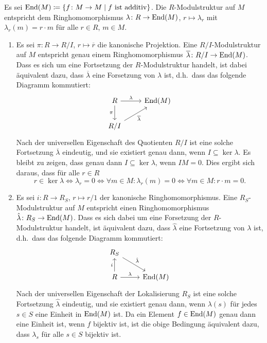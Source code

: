 \begin{solution}
  Es sei $\operatorname{End}(M) \coloneqq \{f \colon M \to M \mid \text{$f$ ist additiv}\}$.
  Die $R$-Modulstruktur auf $M$ entspricht dem Ringhomomorphismus $\lambda \colon R \to \operatorname{End}(M)$, $r \mapsto \lambda_r$ mit $\lambda_r(m) = r \cdot m$ für alle $r \in R$, $m \in M$.
  \begin{enumerate}
    \item
      Es sei $\pi \colon R \to R/I$, $r \mapsto \overline{r}$ die kanonische Projektion.
      Eine $R/I$-Modulstruktur auf $M$ entspricht genau einem Ringhomomorphismus $\overline{\lambda} \colon R/I \to \operatorname{End}(M)$.
      Dass es sich um eine Fortsetzung der $R$-Modulstruktur handelt, ist dabei äquivalent dazu, dass $\overline{\lambda}$ eine Forsetzung von $\lambda$ ist, d.h.\ dass das folgende Diagramm kommutiert:
      \[
        \begin{tikzcd}[ampersand replacement = \&]
              R
              \arrow{r}{\lambda}
              \arrow[swap]{d}{\pi}
          \&  \End(M)
          \\
              R/I
              \arrow[swap]{ru}{\overline{\lambda}}
          \&  {}
        \end{tikzcd}
      \]
      Nach der universellen Eigenschaft des Quotienten $R/I$ ist eine solche Fortsetzung $\overline{\lambda}$ eindeutig, und sie existiert genau dann, wenn $I \subseteq \ker \lambda$.
      Es bleibt zu zeigen, dass genau dann $I \subseteq \ker \lambda$, wenn $IM = 0$.
      Dies ergibt sich daraus, dass für alle $r \in R$
      \[
              r \in \ker \lambda
        \iff  \lambda_r = 0
        \iff  \forall m \in M : \lambda_r(m) = 0
        \iff  \forall m \in M : r \cdot m = 0.
      \]
    \item
      Es sei $i \colon R \to R_S$, $r \mapsto r/1$ der kanonische Ringhomomorphismus.
      Eine $R_S$-Mo\-dul\-struk\-tur auf $M$ entspricht einen Ringhomomorphismus $\hat{\lambda} \colon R_S \to \operatorname{End}(M)$.
      Dass es sich dabei um eine Forsetzung der $R$-Modulstruktur handelt, ist äquivalent dazu, dass $\hat{\lambda}$ eine Fortsetzung von $\lambda$ ist, d.h.\ dass das folgende Diagramm kommutiert:
      \[
        \begin{tikzcd}[ampersand replacement = \&]
              R_S
              \arrow{rd}{\hat{\lambda}}
          \&  {}
          \\
              R
              \arrow{u}{i}
              \arrow{r}{\lambda}
          \&  \End(M)
        \end{tikzcd}
      \]
      Nach der universellen Eigenschaft der Lokalisierung $R_S$ ist eine solche Fortsetzung $\hat{\lambda}$ eindeutig, und sie existiert genau dann, wenn $\lambda(s)$ für jedes $s \in S$ eine Einheit in $\operatorname{End}(M)$ ist.
      Da ein Element $f \in \operatorname{End}(M)$ genau dann eine Einheit ist, wenn $f$ bijektiv ist, ist die obige Bedingung äquivalent dazu, dass $\lambda_s$ für alle $s \in S$ bijektiv ist.
  \end{enumerate}
\end{solution}



